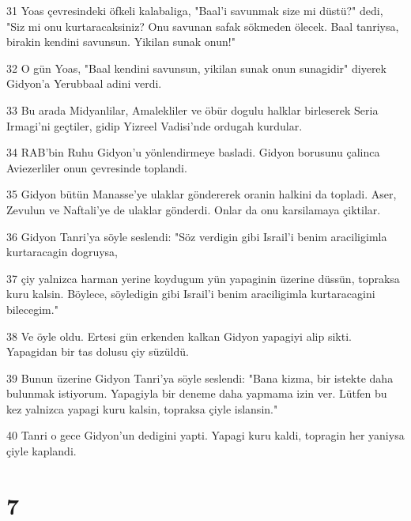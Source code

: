 \par 31 Yoas çevresindeki öfkeli kalabaliga, "Baal'i savunmak size mi düstü?" dedi, "Siz mi onu kurtaracaksiniz? Onu savunan safak sökmeden ölecek. Baal tanriysa, birakin kendini savunsun. Yikilan sunak onun!"
\par 32 O gün Yoas, "Baal kendini savunsun, yikilan sunak onun sunagidir" diyerek Gidyon'a Yerubbaal adini verdi.
\par 33 Bu arada Midyanlilar, Amalekliler ve öbür dogulu halklar birleserek Seria Irmagi'ni geçtiler, gidip Yizreel Vadisi'nde ordugah kurdular.
\par 34 RAB'bin Ruhu Gidyon'u yönlendirmeye basladi. Gidyon borusunu çalinca Aviezerliler onun çevresinde toplandi.
\par 35 Gidyon bütün Manasse'ye ulaklar göndererek oranin halkini da topladi. Aser, Zevulun ve Naftali'ye de ulaklar gönderdi. Onlar da onu karsilamaya çiktilar.
\par 36 Gidyon Tanri'ya söyle seslendi: "Söz verdigin gibi Israil'i benim araciligimla kurtaracagin dogruysa,
\par 37 çiy yalnizca harman yerine koydugum yün yapaginin üzerine düssün, topraksa kuru kalsin. Böylece, söyledigin gibi Israil'i benim araciligimla kurtaracagini bilecegim."
\par 38 Ve öyle oldu. Ertesi gün erkenden kalkan Gidyon yapagiyi alip sikti. Yapagidan bir tas dolusu çiy süzüldü.
\par 39 Bunun üzerine Gidyon Tanri'ya söyle seslendi: "Bana kizma, bir istekte daha bulunmak istiyorum. Yapagiyla bir deneme daha yapmama izin ver. Lütfen bu kez yalnizca yapagi kuru kalsin, topraksa çiyle islansin."
\par 40 Tanri o gece Gidyon'un dedigini yapti. Yapagi kuru kaldi, topragin her yaniysa çiyle kaplandi.

\chapter{7}

